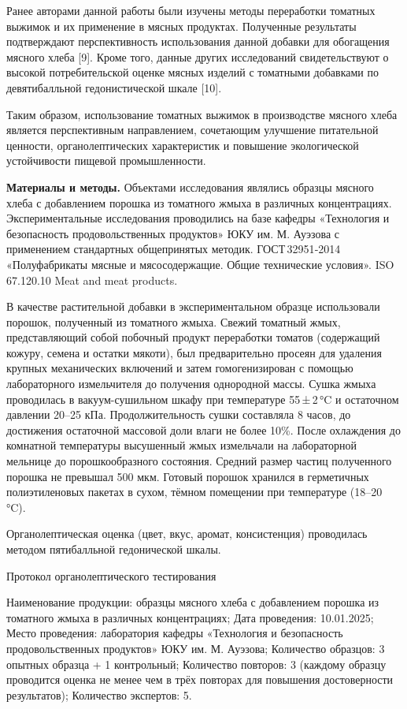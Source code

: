 \begin{multicols}{2}
Ранее авторами данной работы были изучены методы переработки томатных
выжимок и их применение в мясных продуктах. Полученные результаты
подтверждают перспективность использования данной добавки для обогащения
мясного хлеба {[}9{]}. Кроме того, данные других исследований
свидетельствуют о высокой потребительской оценке мясных изделий с
томатными добавками по девятибалльной гедонистической шкале {[}10{]}.

Таким образом, использование томатных выжимок в производстве мясного
хлеба является перспективным направлением, сочетающим улучшение
питательной ценности, органолептических характеристик и повышение
экологической устойчивости пищевой промышленности.

{\bfseries Материалы и методы.} Объектами исследования являлись образцы
мясного хлеба с добавлением порошка из томатного жмыха в различных
концентрациях. Экспериментальные исследования проводились на базе
кафедры «Технология и безопасность продовольственных продуктов» ЮКУ им.
М. Ауэзова с применением стандартных общепринятых методик.
ГОСТ\,32951‑2014 «Полуфабрикаты мясные и мясосодержащие. Общие
технические условия». ISO 67.120.10 Meat and meat products.

В качестве растительной добавки в экспериментальном образце использовали
порошок, полученный из томатного жмыха. Свежий томатный жмых,
представляющий собой побочный продукт переработки томатов (содержащий
кожуру, семена и остатки мякоти), был предварительно просеян для
удаления крупных механических включений и затем гомогенизирован с
помощью лабораторного измельчителя до получения однородной массы. Сушка
жмыха проводилась в вакуум-сушильном шкафу при температуре 55\,±\,2\,°C
и остаточном давлении 20--25 кПа. Продолжительность сушки составляла 8
часов, до достижения остаточной массовой доли влаги не более 10\%. После
охлаждения до комнатной температуры высушенный жмых измельчали на
лабораторной мельнице до порошкообразного состояния. Средний размер
частиц полученного порошка не превышал 500 мкм. Готовый порошок хранился
в герметичных полиэтиленовых пакетах в сухом, тёмном помещении при
температуре (18--20\,°C).

Органолептическая оценка (цвет, вкус, аромат, консистенция) проводилась
методом пятибалльной гедонической шкалы.

Протокол органолептического тестирования

Наименование продукции: образцы мясного хлеба с добавлением порошка из
томатного жмыха в различных концентрациях; Дата проведения: 10.01.2025;
Место проведения: лаборатория кафедры «Технология и безопасность
продовольственных продуктов» ЮКУ им. М. Ауэзова; Количество образцов: 3
опытных образца + 1 контрольный; Количество повторов: 3 (каждому образцу
проводится оценка не менее чем в трёх повторах для повышения
достоверности результатов); Количество экспертов: 5.


\end{multicols}
